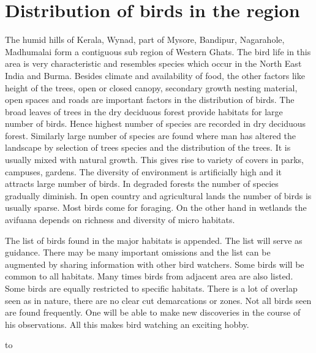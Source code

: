\chapter{Distribution of birds in the region}

The humid hills of Kerala, Wynad, part of Mysore, Bandipur, 
Nagarahole, Madhumalai form a contiguous sub region of Western 
Ghats. The bird life in this area is very characteristic and 
resembles species which occur in the North East India and Burma. 
Besides climate and availability of food, the other factors like 
height of the trees, open or closed canopy, secondary growth 
nesting material, open spaces and roads are important factors in 
the distribution of birds. The broad leaves of trees in the dry 
deciduous forest provide habitats for large number of birds. 
Hence highest number of species are recorded in dry deciduous 
forest. Similarly large number of species are found where man has 
altered the landscape by selection of trees species and the 
distribution of the trees. It is usually mixed with natural 
growth. This gives rise to variety of covers in parks, campuses, 
gardens. The diversity of environment is artificially high and it 
attracts large number of birds. In degraded forests the number of 
species gradually diminish. In open country and agricultural 
lands the number of birds is usually sparse. Most birds come for 
foraging. On the other hand in wetlands the avifuana depends on 
richness and diversity of micro habitats. 

The list of birds found in the major habitats is appended. 
The list will serve as guidance. There may be many important 
omissions and the list can be augmented by sharing information 
with other bird watchers. Some birds will be common to all 
habitats. Many times birds from adjacent area are also listed. Some birds 
are equally restricted to specific habitats. There is a lot of 
overlap seen as in nature, there are no clear cut demarcations or 
zones. Not all birds seen are found frequently. One will be able 
to make new discoveries in the course of his observations. All 
this makes bird watching an exciting hobby. 

\thispagestyle{empty}

\vbox to


\setcounter{chapter}{4}

